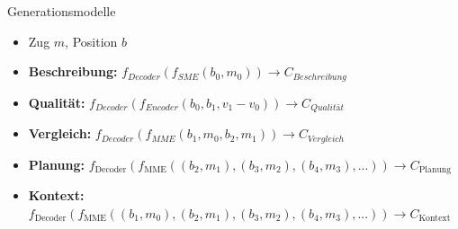 \begin{frame}{Generationsmodelle}
\begin{itemize}[<+->]
	\item Zug $m$, Position $b$ 
	\item \textbf{Beschreibung:} $f_{Decoder}(f_{SME}(b_0,m_0)) \rightarrow C_{Beschreibung}$
	\item \textbf{Qualität:} $f_{Decoder}(f_{Encoder}(b_0,b_1,v_1-v_0)) \rightarrow C_{Qualität}$
	\item \textbf{Vergleich:} $f_{Decoder}(f_{MME}(b_1,m_0,b_2,m_1)) \rightarrow C_{Vergleich}$
	\item \textbf{Planung:} $f_{\text{Decoder}}(f_{\text{MME}}((b_2,m_1),(b_3,m_2),(b_4,m_3),...)) \rightarrow C_{\text{Planung}}$
	\item \textbf{Kontext:} $f_{\text{Decoder}}(f_{\text{MME}}((b_1,m_0),(b_2,m_1),(b_3,m_2),(b_4,m_3),...)) \rightarrow C_{\text{Kontext}}$
\end{itemize}
\end{frame}
